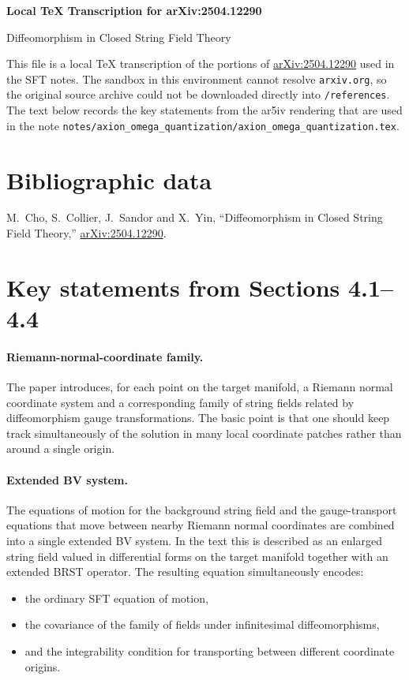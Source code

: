 \documentclass[12pt]{article}
\begin{document}
\begin{center}
{\Large\bf Local TeX Transcription for arXiv:2504.12290}

\vspace{0.3cm}
{\large Diffeomorphism in Closed String Field Theory}
\end{center}

\noindent
This file is a local TeX transcription of the portions of
\href{https://arxiv.org/abs/2504.12290}{arXiv:2504.12290}
used in the SFT notes.  The sandbox in this environment cannot resolve
\texttt{arxiv.org}, so the original source archive could not be downloaded directly into
\texttt{/references}.  The text below records the key statements from the ar5iv rendering that are
used in the note
\texttt{notes/axion\_omega\_quantization/axion\_omega\_quantization.tex}.

\section*{Bibliographic data}

M.~Cho, S.~Collier, J.~Sandor and X.~Yin,
``Diffeomorphism in Closed String Field Theory,''
\href{https://arxiv.org/abs/2504.12290}{arXiv:2504.12290}.

\section*{Key statements from Sections 4.1--4.4}

\paragraph{Riemann-normal-coordinate family.}
The paper introduces, for each point on the target manifold, a Riemann normal coordinate system and a
corresponding family of string fields related by diffeomorphism gauge transformations.  The basic point is
that one should keep track simultaneously of the solution in many local coordinate patches rather than
around a single origin.

\paragraph{Extended BV system.}
The equations of motion for the background string field and the gauge-transport equations that move
between nearby Riemann normal coordinates are combined into a single extended BV system.  In the text this
is described as an enlarged string field valued in differential forms on the target manifold together with
an extended BRST operator.  The resulting equation simultaneously encodes:
\begin{itemize}
\item the ordinary SFT equation of motion,
\item the covariance of the family of fields under infinitesimal diffeomorphisms,
\item and the integrability condition for transporting between different coordinate origins.
\end{itemize}
\end{document}
